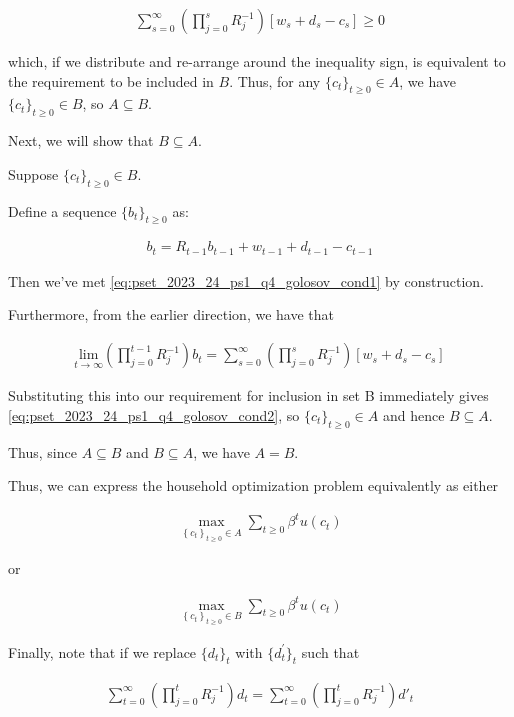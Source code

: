 \begin{align}
    \sum_{s=0}^{\infty}\left(\prod_{j=0}^s R_j^{-1}\right)\left[w_s+d_s-c_s\right] \geq 0
\end{align}

which, if we distribute and re-arrange around the inequality sign, is equivalent to the 
requirement to be included in $B$. Thus, for any $\{c_t\}_{t \geq 0} \in A$, we have $\{c_t\}_{t \geq 0} \in B$, so $A \subseteq B$.

Next, we will show that $B \subseteq A$.

Suppose $\{c_t\}_{t \geq 0} \in B$. 

Define a sequence $\{b_t\}_{t \geq 0}$ as:

\begin{align}
    b_t = R_{t-1}b_{t-1} + w_{t-1} + d_{t-1} - c_{t-1}
\end{align}

Then we've met \eqref{eq:pset_2023_24_ps1_q4_golosov_cond1} by construction.

Furthermore, from the earlier direction, we have that 

\begin{align}
    \underset{t \rightarrow \infty}{\text{lim}} (\prod_{j=0}^{t-1} R_j^{-1})b_t = \sum_{s =0}^{\infty}( \prod_{j=0}^s R_j^{-1})[w_s + d_s - c_s]
\end{align}

Substituting this into our requirement for inclusion in set B immediately 
gives \eqref{eq:pset_2023_24_ps1_q4_golosov_cond2}, so $\{c_t\}_{t \geq 0} \in A$
and hence $B \subseteq A$.

Thus, since $A \subseteq B$ and $B \subseteq A$, we have $A = B$.

Thus, we can express the household optimization problem equivalently as
either 

\begin{align}
    \max_{\left\{c_t\right\}_{t \geq 0} \in A} \sum_{t \geq 0} \beta^t u\left(c_t\right)
\end{align}

or 

\begin{align}
    \max_{\left\{c_t\right\}_{t \geq 0} \in B} \sum_{t \geq 0} \beta^t u\left(c_t\right)
\end{align}

Finally, note that 
if we replace $\{d_t\}_t$ with $\{d_t^{\prime}\}_t$ such that 

\begin{align}
    \sum_{t=0}^{\infty}\left(\prod_{j=0}^t R_j^{-1}\right) d_t=\sum_{t=0}^{\infty}\left(\prod_{j=0}^t R_j^{-1}\right) d'_t
\end{align}

